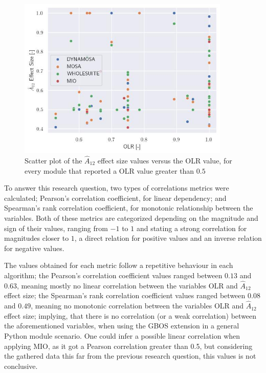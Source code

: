 \documentclass[%
  chapterprefix=false,%
  open=right,%
  twoside=true,%
  paper=a4,%
  logofile={Figures/logo.png},%
  thesistype=master,%
  UKenglish,%
]{se2thesis}
\begin{document}
\begin{figure}[bth]
  \centering
  \includegraphics[width=0.9\textwidth]{Figures/Results/scatterplot.jpg}
  \caption{Scatter plot of the \(\hat{A}_{12}\) effect size values versus the OLR value, for every module that reported a OLR value greater than \(0.5\)}\label{fig:scatter}
\end{figure}

To answer this research question, two types of correlations metrics were calculated; Pearson's correlation coefficient, for linear dependency; and Spearman's rank correlation coefficient, for monotonic relationship between the variables.
Both of these metrics are categorized depending on the magnitude and sign of their values, ranging from \(-1\) to \(1\) and stating a strong correlation for magnitudes closer to \(1\), a direct relation for positive values and an inverse relation for negative values.

The values obtained for each metric follow a repetitive behaviour in each algorithm; the Pearson's correlation coefficient values ranged between \(0.13\) and \(0.63\), meaning mostly no linear correlation between the variables OLR and \(\hat{A}_{12}\) effect size; the Spearman's rank correlation coefficient values ranged between \(0.08\) and \(0.49\), meaning no monotonic correlation between the variables OLR and \(\hat{A}_{12}\) effect size; implying, that there is no correlation (or a weak correlation) between the aforementioned variables, when using the GBOS extension in a general Python module scenario.
One could infer a possible linear correlation when applying MIO, as it got a Pearson correlation greater than 0.5, but considering the gathered data this far from the previous research question, this values is not conclusive.
\end{document}
